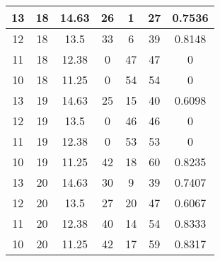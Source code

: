 \documentclass[letterpaper, 12pt]{article}
\begin{document}
\begin{longtable}{|c|c|c|c|c|c|c|}
\hline
13 & 18 & 14.63 & 26 & 1 & 27 & 0.7536 \\
\hline
12 & 18 & 13.5 & 33 & 6 & 39 & 0.8148 \\
\hline
11 & 18 & 12.38 & 0 & 47 & 47 & 0 \\
\hline
10 & 18 & 11.25 & 0 & 54 & 54 & 0 \\
\hline
13 & 19 & 14.63 & 25 & 15 & 40 & 0.6098 \\
\hline
12 & 19 & 13.5 & 0 & 46 & 46 & 0 \\
\hline
11 & 19 & 12.38 & 0 & 53 & 53 & 0 \\
\hline
10 & 19 & 11.25 & 42 & 18 & 60 & 0.8235 \\
\hline
13 & 20 & 14.63 & 30 & 9 & 39 & 0.7407 \\
\hline
12 & 20 & 13.5 & 27 & 20 & 47 & 0.6067 \\
\hline
11 & 20 & 12.38 & 40 & 14 & 54 & 0.8333 \\
\hline
10 & 20 & 11.25 & 42 & 17 & 59 & 0.8317 \\
\hline
\end{longtable}
\end{document}
